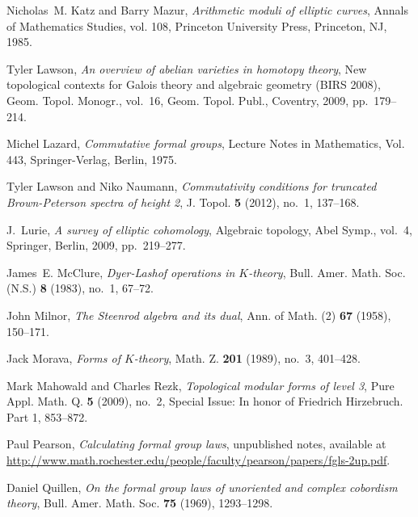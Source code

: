 \documentclass{rs}
\theoremstyle{definition}
\theoremstyle{remark}
\begin{document}
\begin{thebibliography}
Nicholas~M. Katz and Barry Mazur, \emph{Arithmetic moduli of elliptic curves},
  Annals of Mathematics Studies, vol. 108, Princeton University Press,
  Princeton, NJ, 1985. 

Tyler Lawson, \emph{An overview of abelian varieties in homotopy theory}, New
  topological contexts for {G}alois theory and algebraic geometry ({BIRS}
  2008), Geom. Topol. Monogr., vol.~16, Geom. Topol. Publ., Coventry, 2009,
  pp.~179--214. 

Michel Lazard, \emph{Commutative formal groups}, Lecture Notes in Mathematics,
  Vol. 443, Springer-Verlag, Berlin, 1975. 

Tyler Lawson and Niko Naumann, \emph{Commutativity conditions for truncated
  {B}rown-{P}eterson spectra of height 2}, J. Topol. \textbf{5} (2012), no.~1,
  137--168. 

J.~Lurie, \emph{A survey of elliptic cohomology}, Algebraic topology, Abel
  Symp., vol.~4, Springer, Berlin, 2009, pp.~219--277. 

James~E. McClure, \emph{Dyer-{L}ashof operations in {$K$}-theory}, Bull. Amer.
  Math. Soc. (N.S.) \textbf{8} (1983), no.~1, 67--72. 

John Milnor, \emph{The {S}teenrod algebra and its dual}, Ann. of Math. (2)
  \textbf{67} (1958), 150--171. 

Jack Morava, \emph{Forms of {$K$}-theory}, Math. Z. \textbf{201} (1989), no.~3,
  401--428. 

Mark Mahowald and Charles Rezk, \emph{Topological modular forms of level 3},
  Pure Appl. Math. Q. \textbf{5} (2009), no.~2, Special Issue: In honor of
  Friedrich Hirzebruch. Part 1, 853--872. 

Paul Pearson, \emph{Calculating formal group laws}, unpublished notes,
  available at
  \href{http://www.math.rochester.edu/people/faculty/pearson/papers/fgls-2up.pdf}{http://\linebreak www.math.rochester.edu/people/faculty/pearson/papers/fgls-2up.pdf}.

Daniel Quillen, \emph{On the formal group laws of unoriented and complex
  cobordism theory}, Bull. Amer. Math. Soc. \textbf{75} (1969), 1293--1298.


\end{thebibliography}
\end{document}
